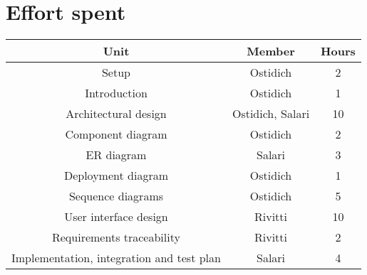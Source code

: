 \chapter{Effort spent}

\begin{table}[h]
    \centering
    \begin{tabular}{|c|c|c|}
        \hline \textbf{Unit} & \textbf{Member} & \textbf{Hours} \\
        \hline Setup & Ostidich & 2 \\
        \hline Introduction & Ostidich & 1 \\
        \hline Architectural design & Ostidich, Salari & 10 \\
        \hline Component diagram & Ostidich & 2 \\
        \hline ER diagram & Salari & 3 \\
        \hline Deployment diagram & Ostidich & 1 \\
        \hline Sequence diagrams & Ostidich & 5 \\
        \hline User interface design & Rivitti & 10 \\
        \hline Requirements traceability & Rivitti & 2 \\
        \hline Implementation, integration and test plan & Salari & 4 \\
        \hline
    \end{tabular}
\end{table}

